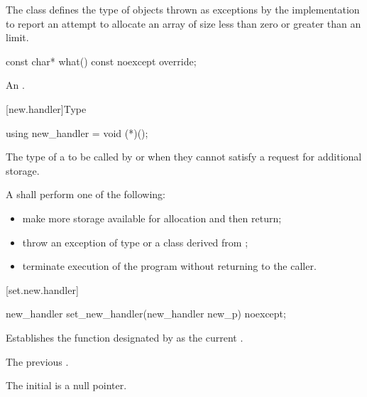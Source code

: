 \pnum
The class  defines the type of objects thrown as
exceptions by the implementation to report an attempt to allocate an array of size
less than zero or
greater than an  limit.

%
\begin{itemdecl}
const char* what() const noexcept override;
\end{itemdecl}

\begin{itemdescr}
\pnum
\returns
An  \ntbs{}.
\end{itemdescr}

[new.handler]{Type }

%
\begin{itemdecl}
using new_handler = void (*)();
\end{itemdecl}

\begin{itemdescr}
\pnum
The type of a
to be called by
or
 when they cannot satisfy a request for additional storage.

\pnum
\required
A  shall perform one of the following:

\begin{itemize}
\item
make more storage available for allocation and then return;
\item
throw an exception of type
or a class derived from
%
;
\item
terminate execution of the program without returning to the caller.
%
%
\end{itemize}
\end{itemdescr}

[set.new.handler]{}

%
\begin{itemdecl}
new_handler set_new_handler(new_handler new_p) noexcept;
\end{itemdecl}

\begin{itemdescr}
\pnum
\effects
Establishes the function designated by  as the current
.

\pnum
\returns
The previous .

\pnum
\remarks
The initial  is a null pointer.
\end{itemdescr}

